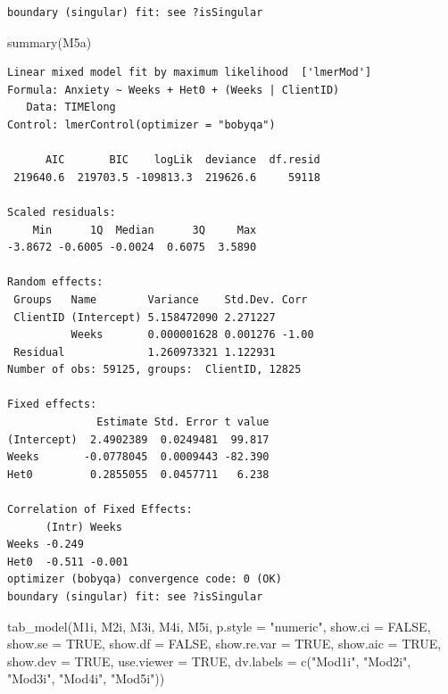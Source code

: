 \documentclass[
  11pt,
]{book}
\newenvironment{Shaded}{\begin{snugshade}}{\end{snugshade}}
\newcommand{\AttributeTok}[1]{\textcolor[rgb]{0.77,0.63,0.00}{#1}}
\newcommand{\ConstantTok}[1]{\textcolor[rgb]{0.00,0.00,0.00}{#1}}
\newcommand{\FunctionTok}[1]{\textcolor[rgb]{0.00,0.00,0.00}{#1}}
\newcommand{\NormalTok}[1]{#1}
\newcommand{\StringTok}[1]{\textcolor[rgb]{0.31,0.60,0.02}{#1}}
\begin{document}
\begin{verbatim}
boundary (singular) fit: see ?isSingular
\end{verbatim}

\begin{Shaded}
\begin{Highlighting}[]
\FunctionTok{summary}\NormalTok{(M5a)}
\end{Highlighting}
\end{Shaded}

\begin{verbatim}
Linear mixed model fit by maximum likelihood  ['lmerMod']
Formula: Anxiety ~ Weeks + Het0 + (Weeks | ClientID)
   Data: TIMElong
Control: lmerControl(optimizer = "bobyqa")

      AIC       BIC    logLik  deviance  df.resid 
 219640.6  219703.5 -109813.3  219626.6     59118 

Scaled residuals: 
    Min      1Q  Median      3Q     Max 
-3.8672 -0.6005 -0.0024  0.6075  3.5890 

Random effects:
 Groups   Name        Variance    Std.Dev. Corr 
 ClientID (Intercept) 5.158472090 2.271227      
          Weeks       0.000001628 0.001276 -1.00
 Residual             1.260973321 1.122931      
Number of obs: 59125, groups:  ClientID, 12825

Fixed effects:
              Estimate Std. Error t value
(Intercept)  2.4902389  0.0249481  99.817
Weeks       -0.0778045  0.0009443 -82.390
Het0         0.2855055  0.0457711   6.238

Correlation of Fixed Effects:
      (Intr) Weeks 
Weeks -0.249       
Het0  -0.511 -0.001
optimizer (bobyqa) convergence code: 0 (OK)
boundary (singular) fit: see ?isSingular
\end{verbatim}

\begin{Shaded}
\begin{Highlighting}[]
\FunctionTok{tab\_model}\NormalTok{(M1i, M2i, M3i, M4i, M5i, }\AttributeTok{p.style =} \StringTok{"numeric"}\NormalTok{, }\AttributeTok{show.ci =} \ConstantTok{FALSE}\NormalTok{, }\AttributeTok{show.se =} \ConstantTok{TRUE}\NormalTok{, }\AttributeTok{show.df =} \ConstantTok{FALSE}\NormalTok{, }\AttributeTok{show.re.var =} \ConstantTok{TRUE}\NormalTok{, }\AttributeTok{show.aic =} \ConstantTok{TRUE}\NormalTok{, }\AttributeTok{show.dev =} \ConstantTok{TRUE}\NormalTok{, }\AttributeTok{use.viewer =} \ConstantTok{TRUE}\NormalTok{, }\AttributeTok{dv.labels =} \FunctionTok{c}\NormalTok{(}\StringTok{"Mod1i"}\NormalTok{, }\StringTok{"Mod2i"}\NormalTok{, }\StringTok{"Mod3i"}\NormalTok{, }\StringTok{"Mod4i"}\NormalTok{, }\StringTok{"Mod5i"}\NormalTok{))}
\end{Highlighting}
\end{Shaded}
\end{document}
